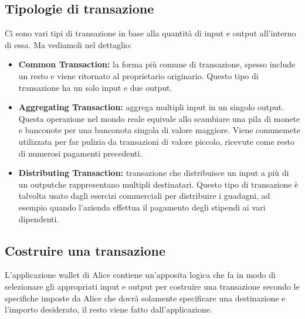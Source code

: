 \subsection*{Tipologie di transazione}
Ci sono vari tipi di transazione in base alla quantità di input e output all'interno di essa. Ma vediamoli nel dettaglio:
\begin{itemize}
	\item \textbf{Common Transaction:} la forma più comune di transazione, spesso include un resto e viene ritornato al proprietario originario. Questo tipo di transazione ha un solo input e due output.
	\item \textbf{Aggregating Transaction:} aggrega multipli input in un singolo output. Questa operazione nel mondo reale equivale allo scambiare una pila di monete e banconote per una banconota singola di valore maggiore. Viene comunemete utilizzata per far pulizia da transazioni di valore piccolo, ricevute come resto di numerosi pagamenti precedenti.
	\item \textbf{Distributing Transaction:} transazione che distribuisce un input a più di un outputche rappresentano multipli destinatari. Questo tipo di transazione è talvolta usato dagli esercizi commerciali per distribuire i guadagni, ad esempio quando l'azienda effettua il pagamento degli stipendi ai vari dipendenti.
\end{itemize}

\subsection{Costruire una transazione}
L'applicazione wallet di Alice contiene un'apposita logica che fa in modo di selezionare gli appropriati input e output per costruire una transazione secondo le specifiche imposte da Alice che dovrà solamente specificare una destinazione e l'importo desiderato, il resto viene fatto dall'applicazione.

